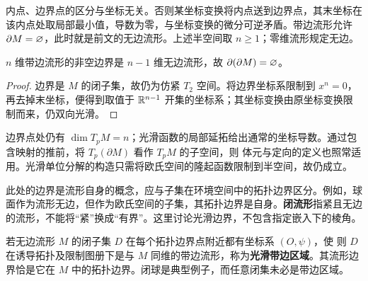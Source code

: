 \begin{remark}
    内点、边界点的区分与坐标无关。否则某坐标变换将内点送到边界点，其末坐标在该内点处取局部最小值，导数为零，与坐标变换的微分可逆矛盾。带边流形允许 $\partial M=\varnothing$，此时就是前文的无边流形。上述半空间取 $n\geqslant1$；零维流形规定无边。
\end{remark}

\begin{theorem}\label{thm:boundary-no-boundary}
    $n$ 维带边流形的非空边界是 $n-1$ 维无边流形，故 $\partial(\partial M)=\varnothing$。
\end{theorem}
\begin{proof}
    边界是 $M$ 的闭子集，故仍为仿紧 $T_2$ 空间。将边界坐标系限制到 $x^n=0$，再去掉末坐标，便得到取值于 $\mathbb{R}^{n-1}$ 开集的坐标系；其坐标变换由原坐标变换限制而来，仍双向光滑。
\end{proof}

边界点处仍有 $\dim T_pM=n$；光滑函数的局部延拓给出通常的坐标导数。通过包含映射的推前，将 $T_p(\partial M)$ 看作 $T_pM$ 的子空间，则
体元与定向的定义也照常适用。光滑单位分解的构造只需将欧氏空间的隆起函数限制到半空间，故仍成立。

\begin{remark}
    此处的边界是流形自身的概念，应与子集在环境空间中的拓扑边界区分。例如，球面作为流形无边，但作为欧氏空间的子集，其拓扑边界是自身。\textbf{闭流形}指紧且无边的流形，不能将“紧”换成“有界”。这里讨论光滑边界，不包含指定嵌入下的棱角。
\end{remark}

\begin{example}
    若无边流形 $M$ 的闭子集 $D$ 在每个拓扑边界点附近都有坐标系 $(O,\psi)$，使
    则 $D$ 在诱导拓扑及限制图册下是与 $M$ 同维的带边流形，称为\textbf{光滑带边区域}。其流形边界恰是它在 $M$ 中的拓扑边界。闭球是典型例子，而任意闭集未必是带边区域。
\end{example}

